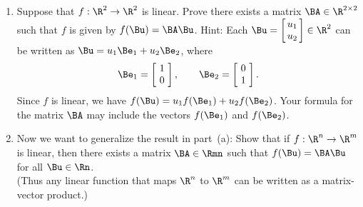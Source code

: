 \begin{enumerate}
\item Suppose that $f: \R^2 \to \R^2$ is linear.  
      Prove there exists a matrix $\BA\in\R^{2\times 2}$ such that
      $f$ is given by $f(\Bu) = \BA\Bu$.  
      Hint: Each $\Bu  = \left[\!\!\begin{array}{c} u_1 \\ u_2\end{array}\!\!\right] \in \R^2$
            can be written as $\Bu = u_1 \Be_1 + u_2 \Be_2$, where
                 \[ \Be_1 = \left[\!\begin{array}{c} 1 \\ 0\end{array}\!\right], \qquad
                    \Be_2 = \left[\!\begin{array}{c} 0 \\ 1\end{array}\!\right]. \] 
      Since $f$ is linear, we have $f(\Bu) =  u_1 f(\Be_1) + u_2 f(\Be_2)$.
      Your formula for the matrix $\BA$ may include the vectors $f(\Be_1)$ and $f(\Be_2)$.

\item Now we want to generalize the result in part~(a): Show that if 
      $f: \R^n \to \R^m$ is linear, then there exists a matrix $\BA\in\Rmn$
      such that $f(\Bu) = \BA\Bu$ for all $\Bu\in\Rn$.\\[0.5em]
      (Thus any linear function that maps $\R^n$ to $\R^m$ can be written 
        as a matrix-vector product.)
\end{enumerate}


